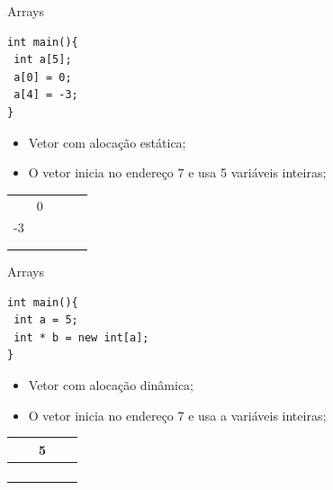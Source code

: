 \documentclass[12pt,table,xcolor={dvipsnames}]{beamer}
\begin{document}
\begin{frame}[fragile]{Arrays}
\begin{lstlisting}
int main(){
 int a[5];
 a[0] = 0;
 a[4] = -3;
}
\end{lstlisting}
\begin{itemize}
\item Vetor com alocação estática;
\item O vetor inicia no endereço 7 e usa 5 variáveis inteiras;
\end{itemize}
{
\begin{tabular}{ |p{1cm}|p{1cm}|p{1cm}|p{1cm}|p{1cm}| }
\hline
& & & & \\ \hline
& \cellcolor{Mahogany}0 &\cellcolor{Mahogany} &\cellcolor{Mahogany} & \cellcolor{Mahogany}\\ \hline
\cellcolor{Mahogany} -3 & & & & \\ \hline
& & & & \\ \hline
& & & & \\ \hline
\end{tabular}
}
\end{frame}

\begin{frame}[fragile]{Arrays}
\begin{lstlisting}
int main(){
 int a = 5;
 int * b = new int[a];
}
\end{lstlisting}
\begin{itemize}
\item Vetor com alocação dinâmica;
\item O vetor inicia no endereço 7 e usa a variáveis inteiras;
\end{itemize}
{
\begin{tabular}{ |p{1cm}|p{1cm}|p{1cm}|p{1cm}|p{1cm}| }
\hline
& & \cellcolor{OliveGreen}5 & & \\ \hline
& &\cellcolor{Mahogany} &\cellcolor{Mahogany} & \cellcolor{Mahogany}\\ \hline
\cellcolor{Mahogany} & \cellcolor{Mahogany} & & & \\ \hline
& & & & \\ \hline
& & & & \\ \hline
\end{tabular}
}
\end{frame}
\end{document}
